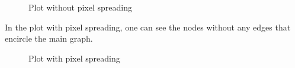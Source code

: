 \documentclass[12pt, a4paper]{article}
\begin{document}
\begin{figure}[H]
    \centering
    \caption{Plot without pixel spreading}
    \label{fig:youtube_ds_com_nospread}
\end{figure}

In the plot with pixel spreading, one can see the nodes without any edges that encircle the main graph.

\begin{figure}[H]
    \centering
    \caption{Plot with pixel spreading}
    \label{fig:youtube_ds_com_spread}
\end{figure}
\end{document}
